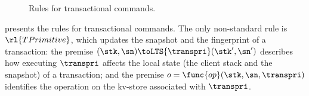 \begin{figure*}[!t]
\begin{center}
\end{center}

\hrulefill

\caption{Rules for transactional commands.}
\label{fig:semantics-trans}
\end{figure*}

 presents the rules for transactional commands. 
The only non-standard rule is \( \rl{TPrimitive} \), which updates 
the snapshot and the fingerprint of a transaction: the premise 
$(\stk, \sn) \toLTS{\transpri} (\stk', \sn')$ describes how executing
$\transpri$ affects the local state (the client stack and the snapshot)
of a transaction; and the premise $o =\func{op}(\stk, \sn, \transpri)$ identifies the operation on the 
kv-store associated with $\transpri$. 

